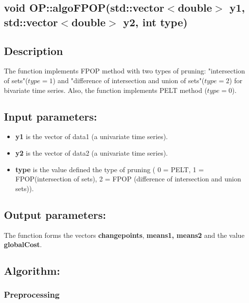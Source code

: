 \documentclass{report}
\begin{document}
\newpage

\label{algoFPOP}
\begin{center} 
	\section*{\bfseries void OP::algoFPOP(std::vector$<$double$>$ y1, std::vector$<$double$>$ y2, int type)}
\end{center} 

\subsection*{Description}

	The function implements FPOP method with two types of pruning: "intersection of sets"($type = 1$) and "difference of intersection and union of sets"($type = 2$) for bivariate time series. Also, the function implements PELT method ($type = 0$).

\subsection*{Input parameters:}

\begin{itemize}
	\item {\bfseries y1} is the vector of data1 (a univariate time series).
	\item {\bfseries y2} is the vector of data2 (a univariate time series).
	\item {\bfseries type} is the value defined the type of pruning ( 0 = PELT, 1 = FPOP(intersection of sets), 2 = FPOP (difference of intersection and union sets)).
\end{itemize}

\subsection*{Output parameters:}

The function forms the vectors {\bfseries changepoints}, {\bfseries means1, means2} and the value {\bfseries globalCost}.

\subsection*{Algorithm:}

\subsubsection*{Preprocessing}
\end{document}
